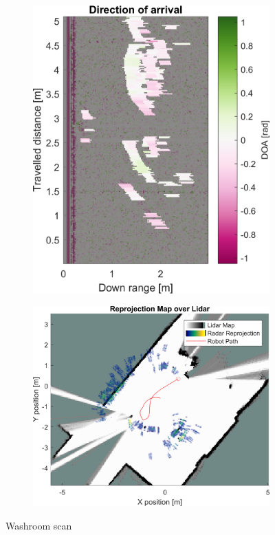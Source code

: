 \begin{figure}[htbp]
\begin{subfigure}[t]{0.475\linewidth}
        \includegraphics[width=\linewidth,max height=.475\textheight]{gfx/results/washroom_doa.png}
    \end{subfigure}%
    \hfill%
    \begin{subfigure}[t]{0.475\linewidth}   
        \centering 
        \includegraphics[width=\linewidth,max height=.475\textheight]{gfx/results/washroom_map.png}
    \end{subfigure}%
    \caption{Washroom scan}
\end{figure}


